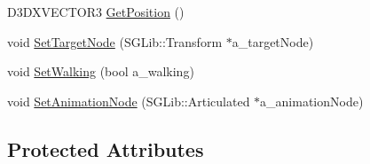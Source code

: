 \begin{DoxyCompactItemize}
\item 
D3DXVECTOR3 \hyperlink{class_feisty_1_1_camera_aa4384bf9913be09d286fbdf7c318f4f5}{GetPosition} ()
\item 
void \hyperlink{class_feisty_1_1_camera_a0e3faebd081573eecbe40c4551926919}{SetTargetNode} (SGLib::Transform $\ast$a\_\-targetNode)
\item 
void \hyperlink{class_feisty_1_1_camera_a8392192850c1bece0cc923001f4479b9}{SetWalking} (bool a\_\-walking)
\item 
void \hyperlink{class_feisty_1_1_camera_a7aca26cc73f4399edd7ede2ae1914cf8}{SetAnimationNode} (SGLib::Articulated $\ast$a\_\-animationNode)
\end{DoxyCompactItemize}
\subsection*{Protected Attributes}
